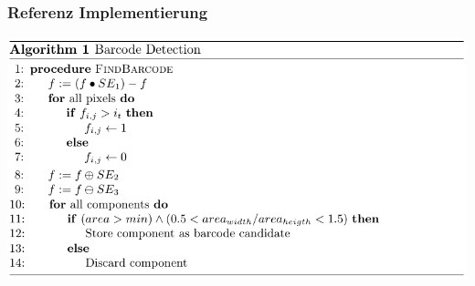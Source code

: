 \documentclass{beamer}
\begin{document}
\begin{frame}
\frametitle{Referenz Implementierung}

\includegraphics[width=\textwidth]{images/algorithm}
  
\end{frame}
\end{document}
